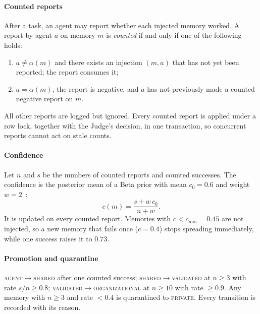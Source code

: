 \documentclass[5p,times,twocolumn]{elsarticle}
\begin{document}
\paragraph{Counted reports}
After a task, an agent may report whether each injected memory worked. A report by agent $a$ on memory $m$ is \emph{counted} if and only if one of the following holds:
\begin{enumerate}
\item $a \neq \alpha(m)$ and there exists an injection $(m,a)$ that has not yet been reported; the report consumes it;
\item $a = \alpha(m)$, the report is negative, and $a$ has not previously made a counted negative report on $m$.
\end{enumerate}
All other reports are logged but ignored. Every counted report is applied under a row lock, together with the Judge's decision, in one transaction, so concurrent reports cannot act on stale counts.

\paragraph{Confidence}
Let $n$ and $s$ be the numbers of counted reports and counted successes. The confidence is the posterior mean of a Beta prior with mean $c_0=0.6$ and weight $w=2$~\cite{josang2002beta}:
\begin{equation}
c(m) = \frac{s + w\,c_0}{n + w}.
\label{eq:confidence}
\end{equation}
It is updated on every counted report. Memories with $c < c_{\min} = 0.45$ are not injected, so a new memory that fails once ($c=0.4$) stops spreading immediately, while one success raises it to $0.73$.

\paragraph{Promotion and quarantine}
\textsc{agent}$\to$\textsc{shared} after one counted success; \textsc{shared}$\to$\textsc{validated} at $n\ge3$ with rate $s/n\ge0.8$; \textsc{validated}$\to$\textsc{organizational} at $n\ge10$ with rate $\ge0.9$. Any memory with $n\ge3$ and rate $<0.4$ is quarantined to \textsc{private}. Every transition is recorded with its reason.
\end{document}

